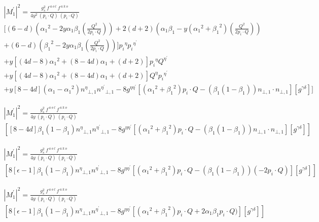 \begin{equation}
\begin{split}
{|{M}^{\prime}_1|}^2 =\frac{g_s^2 \:f^{\:a\:o\:l}\: f^{\:a\:k\:o}}{4y^2\:(p_i\cdot Q) \:(p_i\cdot Q)} \\
[(6-d)({\alpha_1}^2 -2y\alpha_1 \beta_1(\frac{Q^2}{2p_i \cdot Q}))+2(d+2)({\alpha_1}{\beta}_1 -y({\alpha_1}^2 +{\beta_1}^2)(\frac{Q^2}{2p_i \cdot Q}))\\+(6-d)({\beta_1}^2 -2y\alpha_1 \beta_1(\frac{Q^2}{2p_i \cdot Q})) ]{p_i}^{\eta}{p_i}^{{\eta}^{\prime}}\\
+y[(4d-8){\alpha_1}^2+(8-4d){\alpha}_1 +(d+2)] {p_i}^{\eta}{Q}^{{\eta}^{\prime}}\\
+y[(4d-8){\alpha_1}^2+(8-4d){\alpha}_1 +(d+2)]  {Q}^{\eta}{p_i}^{{\eta}^{\prime}}\\+y[8-4d](\alpha_1-{\alpha_1}^2){n^{{\eta}}}_{\bot,1}{n^{{\eta}^{\prime}}}_{\bot,1}-8g^{{\eta}{{\eta}^{\prime}}}[({\alpha_1}^2+{\beta_1}^2) p_i \cdot Q - ({\beta_1}(1-\beta_1)){n}_{\bot,1}\cdot{n}_{\bot,1}][g^{{\gamma}{{\delta}}}]]
\end{split}
\end{equation}

\begin{equation}
\begin{split}
{|{M}^{\prime}_1|}^2 =\frac{g_s^2 \:f^{\:a\:o\:l}\: f^{\:a\:k\:o}}{4y\:(p_i\cdot Q) \:(p_i\cdot Q)} \\
[[8-4d]{\beta_1}(1-\beta_1){n^{{\eta}}}_{\bot,1}{n^{{\eta}^{\prime}}}_{\bot,1}-8g^{{\eta}{{\eta}^{\prime}}}[({\alpha_1}^2+{\beta_1}^2) p_i \cdot Q - ({\beta_1}(1-\beta_1)){n}_{\bot,1}\cdot{n}_{\bot,1}][g^{{\gamma}{{\delta}}}]]
\end{split}
\end{equation}

\begin{equation}
\begin{split}
{|{M}^{\prime}_1|}^2 =\frac{g_s^2 \:f^{\:a\:o\:l}\: f^{\:a\:k\:o}}{4y\:(p_i\cdot Q) \:(p_i\cdot Q)} \\
[8[\epsilon-1]{\beta_1}(1-\beta_1){n^{{\eta}}}_{\bot,1}{n^{{\eta}^{\prime}}}_{\bot,1}-8g^{{\eta}{{\eta}^{\prime}}}[({\alpha_1}^2+{\beta_1}^2) p_i \cdot Q - ({\beta_1}(1-\beta_1))(-2p_i \cdot Q)][g^{{\gamma}{{\delta}}}]]
\end{split}
\end{equation}

\begin{equation}
\begin{split}
{|{M}^{\prime}_1|}^2 =\frac{g_s^2 \:f^{\:a\:o\:l}\: f^{\:a\:k\:o}}{4y\:(p_i\cdot Q) \:(p_i\cdot Q)} \\
[8[\epsilon-1]{\beta_1}(1-\beta_1){n^{{\eta}}}_{\bot,1}{n^{{\eta}^{\prime}}}_{\bot,1}-8g^{{\eta}{{\eta}^{\prime}}}[({\alpha_1}^2+{\beta_1}^2) p_i \cdot Q +2{\alpha_1}{\beta_1} p_i \cdot Q)][g^{{\gamma}{{\delta}}}]]
\end{split}
\end{equation}

